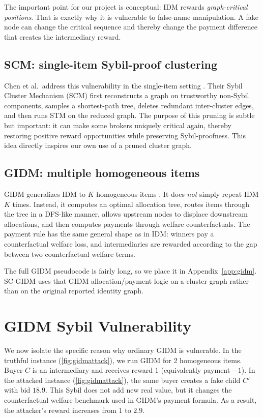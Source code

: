 \documentclass[sigconf]{aamas}
\theoremstyle{definition}
\theoremstyle{remark}
\begin{document}
The important point for our project is conceptual: IDM rewards \emph{graph-critical positions}. That is exactly why it is vulnerable to false-name manipulation. A fake node can change the critical sequence and thereby change the payment difference that creates the intermediary reward.

\subsection{SCM: single-item Sybil-proof clustering}
Chen et al.\ address this vulnerability in the single-item setting \cite{ChenDWWZ23}. Their Sybil Cluster Mechanism (SCM) first reconstructs a graph on trustworthy non-Sybil components, samples a shortest-path tree, deletes redundant inter-cluster edges, and then runs STM on the reduced graph. The purpose of this pruning is subtle but important: it can make some brokers uniquely critical again, thereby restoring positive reward opportunities while preserving Sybil-proofness. This idea directly inspires our own use of a pruned cluster graph.

\subsection{GIDM: multiple homogeneous items}
GIDM generalizes IDM to $K$ homogeneous items \cite{ZhaoLXHJ18}. It does \emph{not} simply repeat IDM $K$ times. Instead, it computes an optimal allocation tree, routes items through the tree in a DFS-like manner, allows upstream nodes to displace downstream allocations, and then computes payments through welfare counterfactuals. The payment rule has the same general shape as in IDM: winners pay a counterfactual welfare loss, and intermediaries are rewarded according to the gap between two counterfactual welfare terms.

The full GIDM pseudocode is fairly long, so we place it in Appendix~\ref{app:gidm}. SC-GIDM uses that GIDM allocation/payment logic on a cluster graph rather than on the original reported identity graph.

\section{GIDM Sybil Vulnerability}
We now isolate the specific reason why ordinary GIDM is vulnerable. In the truthful instance (\ref{fig:gidmattack}), we run GIDM for 2 homogeneous items. Buyer $C$ is an intermediary and receives reward $1$ (equivalently payment $-1$). In the attacked instance (\ref{fig:gidmattack}), the same buyer creates a fake child $C'$ with bid $18.9$. This Sybil does not add new real value, but it changes the counterfactual welfare benchmark used in GIDM's payment formula. As a result, the attacker's reward increases from $1$ to $2.9$.
\end{document}

